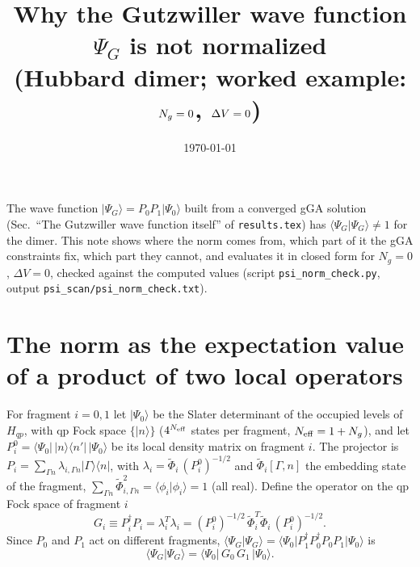 \documentclass[11pt]{article}
\title{Why the Gutzwiller wave function $\Psi_G$ is not normalized\\
\large (Hubbard dimer; worked example: $\Ng=0$, $\dV=0$)}
\author{}
\date{\today}
\newcommand{\Ng}{N_g}
\newcommand{\dV}{\Delta V}
\begin{document}
\maketitle

\noindent The wave function $|\Psi_G\rangle=P_0P_1|\Psi_0\rangle$ built from a converged gGA solution (Sec.~``The Gutzwiller wave function itself'' of \texttt{results.tex}) has $\langle\Psi_G|\Psi_G\rangle\neq1$ for the dimer. This note shows where the norm comes from, which part of it the gGA constraints fix, which part they cannot, and evaluates it in closed form for $\Ng=0$, $\dV=0$, checked against the computed values (script \texttt{psi\_norm\_check.py}, output \texttt{psi\_scan/psi\_norm\_check.txt}).

\section{The norm as the expectation value of a product of two local operators}
For fragment $i=0,1$ let $|\Psi_0\rangle$ be the Slater determinant of the occupied levels of $H_{qp}$, with qp Fock space $\{|n\rangle\}$ ($4^{N_{\rm eff}}$ states per fragment, $N_{\rm eff}=1+\Ng$), and let $P^0_i=\langle\Psi_0|\,|n\rangle\langle n'|\,|\Psi_0\rangle$ be its local density matrix on fragment $i$. The projector is $P_i=\sum_{\Gamma n}\lambda_{i,\Gamma n}|\Gamma\rangle\langle n|$, with $\lambda_i=\tilde\Phi_i\,(P^0_i)^{-1/2}$ and $\tilde\Phi_i[\Gamma,n]$ the embedding state of the fragment, $\sum_{\Gamma n}\tilde\Phi_{i,\Gamma n}^2=\langle\phi_i|\phi_i\rangle=1$ (all real). Define the operator on the qp Fock space of fragment $i$
\begin{equation}
G_i\equiv P_i^\dagger P_i=\lambda_i^{T}\lambda_i=(P^0_i)^{-1/2}\,\tilde\Phi_i^{T}\tilde\Phi_i\,(P^0_i)^{-1/2}.
\label{eq:G}
\end{equation}
Since $P_0$ and $P_1$ act on different fragments, $\langle\Psi_G|\Psi_G\rangle=\langle\Psi_0|P_1^\dagger P_0^\dagger P_0P_1|\Psi_0\rangle$ is
\begin{equation}
\langle\Psi_G|\Psi_G\rangle=\langle\Psi_0|\,G_0\,G_1\,|\Psi_0\rangle .
\label{eq:norm}
\end{equation}
\end{document}
